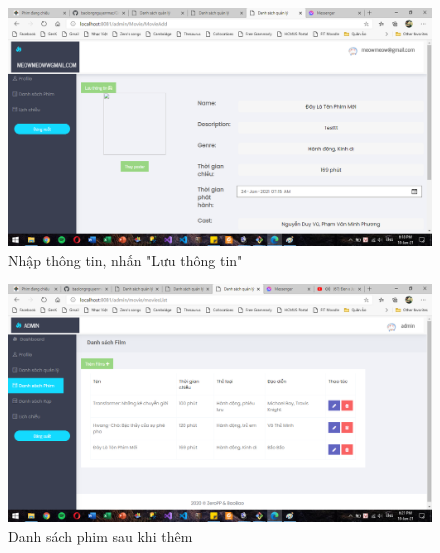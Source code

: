\documentclass[a4paper, 12pt]{article}
\begin{document}
\begin{itemize}
\begin{itemize}
			\begin{figure}[H]
				\begin{center}
					\includegraphics[scale=0.5]{./image/demo_managerAddMovie2.png}
					\caption{Nhập thông tin, nhấn "Lưu thông tin"}
				\end{center}
			\end{figure}
	
			\begin{figure}[H]
				\begin{center}
					\includegraphics[scale=0.5]{./image/demo_managerAddMovie3.png}
					\caption{Danh sách phim sau khi thêm}
				\end{center}
			\end{figure}


\end{itemize}
\end{itemize}
\end{document}

